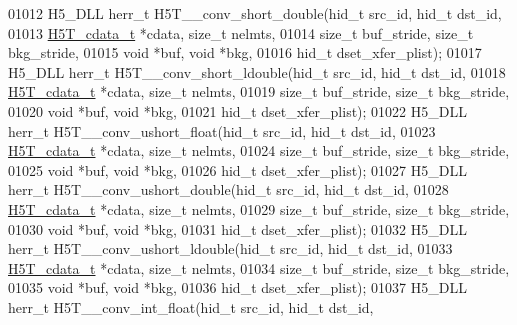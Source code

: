 \begin{DoxyCode}
01012 H5\_DLL herr\_t H5T\_\_conv\_short\_double(hid\_t src\_id, hid\_t dst\_id,
01013                      \hyperlink{struct_h5_t__cdata__t}{H5T\_cdata\_t} *cdata, \textcolor{keywordtype}{size\_t} nelmts,
01014                      \textcolor{keywordtype}{size\_t} buf\_stride, \textcolor{keywordtype}{size\_t} bkg\_stride,
01015                                      \textcolor{keywordtype}{void} *buf, \textcolor{keywordtype}{void} *bkg,
01016                                      hid\_t dset\_xfer\_plist);
01017 H5\_DLL herr\_t H5T\_\_conv\_short\_ldouble(hid\_t src\_id, hid\_t dst\_id,
01018                      \hyperlink{struct_h5_t__cdata__t}{H5T\_cdata\_t} *cdata, \textcolor{keywordtype}{size\_t} nelmts,
01019                      \textcolor{keywordtype}{size\_t} buf\_stride, \textcolor{keywordtype}{size\_t} bkg\_stride,
01020                                      \textcolor{keywordtype}{void} *buf, \textcolor{keywordtype}{void} *bkg,
01021                                      hid\_t dset\_xfer\_plist);
01022 H5\_DLL herr\_t H5T\_\_conv\_ushort\_float(hid\_t src\_id, hid\_t dst\_id,
01023                      \hyperlink{struct_h5_t__cdata__t}{H5T\_cdata\_t} *cdata, \textcolor{keywordtype}{size\_t} nelmts,
01024                      \textcolor{keywordtype}{size\_t} buf\_stride, \textcolor{keywordtype}{size\_t} bkg\_stride,
01025                                      \textcolor{keywordtype}{void} *buf, \textcolor{keywordtype}{void} *bkg,
01026                                      hid\_t dset\_xfer\_plist);
01027 H5\_DLL herr\_t H5T\_\_conv\_ushort\_double(hid\_t src\_id, hid\_t dst\_id,
01028                      \hyperlink{struct_h5_t__cdata__t}{H5T\_cdata\_t} *cdata, \textcolor{keywordtype}{size\_t} nelmts,
01029                      \textcolor{keywordtype}{size\_t} buf\_stride, \textcolor{keywordtype}{size\_t} bkg\_stride,
01030                                      \textcolor{keywordtype}{void} *buf, \textcolor{keywordtype}{void} *bkg,
01031                                      hid\_t dset\_xfer\_plist);
01032 H5\_DLL herr\_t H5T\_\_conv\_ushort\_ldouble(hid\_t src\_id, hid\_t dst\_id,
01033                      \hyperlink{struct_h5_t__cdata__t}{H5T\_cdata\_t} *cdata, \textcolor{keywordtype}{size\_t} nelmts,
01034                      \textcolor{keywordtype}{size\_t} buf\_stride, \textcolor{keywordtype}{size\_t} bkg\_stride,
01035                                      \textcolor{keywordtype}{void} *buf, \textcolor{keywordtype}{void} *bkg,
01036                                      hid\_t dset\_xfer\_plist);
01037 H5\_DLL herr\_t H5T\_\_conv\_int\_float(hid\_t src\_id, hid\_t dst\_id,

\end{DoxyCode}
